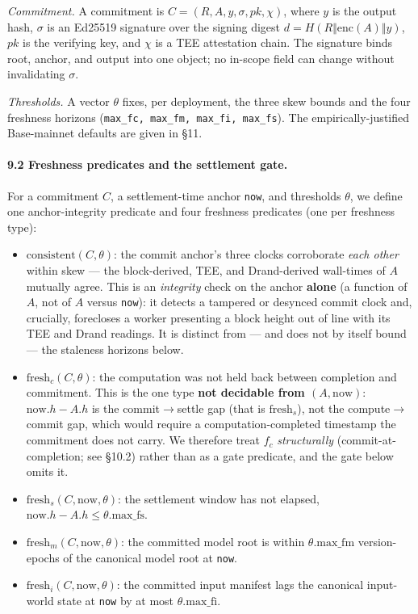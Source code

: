 \documentclass[11pt]{article}
\begin{document}
\emph{Commitment.} A commitment is $C = (R, A, y, \sigma, pk, \chi)$, where $y$ is the output hash, $\sigma$ is an Ed25519 signature over the signing digest $d = H(R \Vert \mathrm{enc}(A) \Vert y)$, $pk$ is the verifying key, and $\chi$ is a TEE attestation chain. The signature binds root, anchor, and output into one object; no in-scope field can change without invalidating $\sigma$.

\emph{Thresholds.} A vector $\theta$ fixes, per deployment, the three skew bounds and the four freshness horizons (\texttt{max\_fc, max\_fm, max\_fi, max\_fs}). The empirically-justified Base-mainnet defaults are given in \S11.

\paragraph{9.2 Freshness predicates and the settlement gate.} For a commitment $C$, a settlement-time anchor \texttt{now}, and thresholds $\theta$, we define one anchor-integrity predicate and four freshness predicates (one per freshness type):

\begin{itemize}
\item $\mathrm{consistent}(C, \theta)$: the commit anchor's three clocks corroborate \emph{each other} within skew --- the block-derived, TEE, and Drand-derived wall-times of $A$ mutually agree. This is an \emph{integrity} check on the anchor \textbf{alone} (a function of $A$, not of $A$ versus \texttt{now}): it detects a tampered or desynced commit clock and, crucially, forecloses a worker presenting a block height out of line with its TEE and Drand readings. It is distinct from --- and does not by itself bound --- the staleness horizons below.
\item $\mathrm{fresh}_c(C, \theta)$: the computation was not held back between completion and commitment. This is the one type \textbf{not decidable from $(A, \mathrm{now})$}: $\mathrm{now}.h - A.h$ is the commit$\to$settle gap (that is $\mathrm{fresh}_s$), not the compute$\to$commit gap, which would require a computation-completed timestamp the commitment does not carry. We therefore treat $f_c$ \emph{structurally} (commit-at-completion; see \S10.2) rather than as a gate predicate, and the gate below omits it.
\item $\mathrm{fresh}_s(C, \mathrm{now}, \theta)$: the settlement window has not elapsed, $\mathrm{now}.h - A.h \le \theta.\mathrm{max\_fs}$.
\item $\mathrm{fresh}_m(C, \mathrm{now}, \theta)$: the committed model root is within $\theta.\mathrm{max\_fm}$ version-epochs of the canonical model root at \texttt{now}.
\item $\mathrm{fresh}_i(C, \mathrm{now}, \theta)$: the committed input manifest lags the canonical input-world state at \texttt{now} by at most $\theta.\mathrm{max\_fi}$.
\end{itemize}
\end{document}
